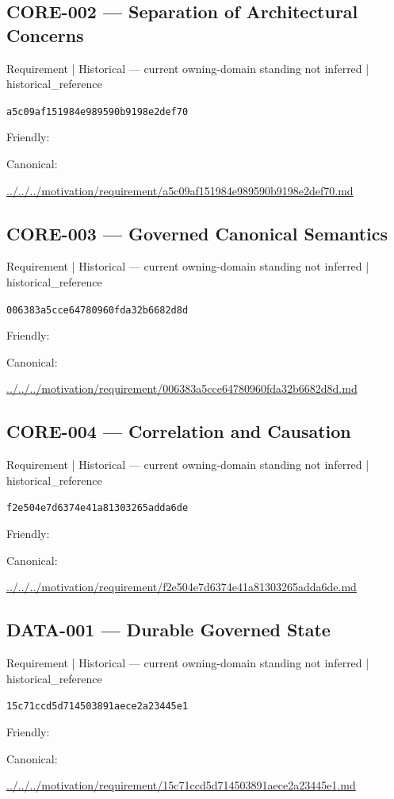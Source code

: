 \documentclass[10pt,a4paper]{article}
\begin{document}
\subsection*{CORE-002 — Separation of Architectural Concerns}
{\small Requirement | Historical — current owning-domain standing not inferred | historical\_reference}\par
\texttt{a5c09af151984e989590b9198e2def70}\par
Friendly: \par
Canonical: \par
{\footnotesize\url{../../../motivation/requirement/a5c09af151984e989590b9198e2def70.md}}\par
\subsection*{CORE-003 — Governed Canonical Semantics}
{\small Requirement | Historical — current owning-domain standing not inferred | historical\_reference}\par
\texttt{006383a5cce64780960fda32b6682d8d}\par
Friendly: \par
Canonical: \par
{\footnotesize\url{../../../motivation/requirement/006383a5cce64780960fda32b6682d8d.md}}\par
\subsection*{CORE-004 — Correlation and Causation}
{\small Requirement | Historical — current owning-domain standing not inferred | historical\_reference}\par
\texttt{f2e504e7d6374e41a81303265adda6de}\par
Friendly: \par
Canonical: \par
{\footnotesize\url{../../../motivation/requirement/f2e504e7d6374e41a81303265adda6de.md}}\par
\subsection*{DATA-001 — Durable Governed State}
{\small Requirement | Historical — current owning-domain standing not inferred | historical\_reference}\par
\texttt{15c71ccd5d714503891aece2a23445e1}\par
Friendly: \par
Canonical: \par
{\footnotesize\url{../../../motivation/requirement/15c71ccd5d714503891aece2a23445e1.md}}\par
\end{document}
